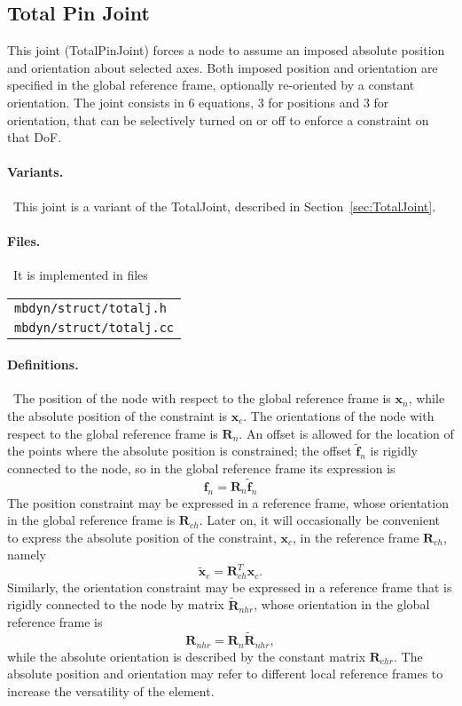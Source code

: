 \documentclass[10pt,dvips,fleqn,subeqn]{report}
\newcommand{\T}[1]{\boldsymbol{#1}}
\begin{document}
\subsection{Total Pin Joint}
\label{sec:TotalPinJoint}
This joint (TotalPinJoint) forces a node to assume an imposed absolute
position and orientation about selected axes.
Both imposed position and orientation are specified 
in the global reference frame, optionally re-oriented 
by a constant orientation.
The joint consists in 6 equations, 3 for positions and 3 for orientation, 
that can be selectively turned on or off to enforce a constraint on that DoF.

\paragraph{Variants.} \
This joint is a variant of the TotalJoint,
described in Section~\ref{sec:TotalJoint}.

\paragraph{Files.} \
It is implemented in files\\
\begin{tabular}{l}
\texttt{mbdyn/struct/totalj.h} \\
\texttt{mbdyn/struct/totalj.cc}
\end{tabular}

\paragraph{Definitions.} \
The position of the node with respect to the global reference frame
is $\T{x}_n$, while the absolute position of the constraint is $\T{x}_c$.
The orientations of the node with respect to the global reference frame
is $\T{R}_n$.
An offset is allowed for the location of the points where 
the absolute position is constrained; the offset $\tilde{\T{f}}_n$
is rigidly connected to the node, so in the global reference frame 
its expression is
\begin{equation}
	\T{f}_n = \T{R}_n \tilde{\T{f}}_n
\end{equation}
The position constraint may be expressed in a reference frame,
whose orientation in the global reference frame is $\T{R}_{ch}$.
Later on, it will occasionally be convenient to express
the absolute position of the constraint, $\T{x}_c$, 
in the reference frame $\T{R}_{ch}$, namely
\begin{equation}
	\tilde{\T{x}}_{c} = \T{R}_{ch}^T \T{x}_c .
\end{equation}
Similarly, the orientation constraint may be expressed in a reference
frame that is rigidly connected to the node by matrix
$\tilde{\T{R}}_{nhr}$, whose orientation in the global reference frame is
\begin{equation}
	\T{R}_{nhr} = \T{R}_n \tilde{\T{R}}_{nhr} ,
\end{equation}
while the absolute orientation is described by the constant matrix
$\T{R}_{chr}$.
The absolute position and orientation may refer to different
local reference frames to increase the versatility of the element.
\end{document}
